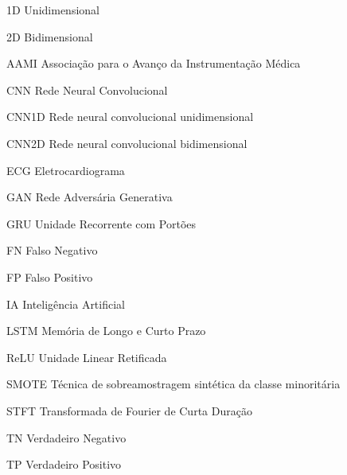 \begin{siglas}
    \item[1D] Unidimensional
    \item[2D] Bidimensional
    \item[AAMI] Associação para o Avanço da Instrumentação Médica 
    \item[CNN] Rede Neural Convolucional
    \item[CNN1D] Rede neural convolucional unidimensional
    \item[CNN2D] Rede neural convolucional bidimensional
    \item[ECG] Eletrocardiograma
    \item[GAN] Rede Adversária Generativa 
    \item[GRU] Unidade Recorrente com Portões
    \item[FN] Falso Negativo
    \item[FP] Falso Positivo
    \item[IA] Inteligência Artificial
    \item[LSTM] Memória de Longo e Curto Prazo
    \item[ReLU] Unidade Linear Retificada
    \item[SMOTE] Técnica de sobreamostragem sintética da classe minoritária
    \item[STFT] Transformada de Fourier de Curta Duração
    \item[TN] Verdadeiro Negativo 
    \item[TP] Verdadeiro Positivo  
\end{siglas}